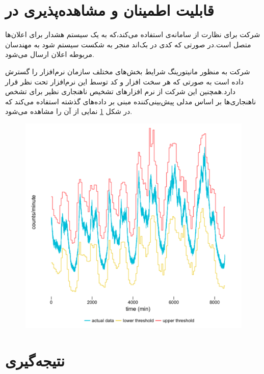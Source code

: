 \section{قابلیت اطمینان و مشاهده‌پذیری در }
شرکت  برای نظارت از سامانه‌ی \cite{Nagios} استفاده می‌کند،که به یک سیستم هشدار برای اعلان‌ها متصل است.در صورتی که کدی در بک‌اند منجر به شکست سیستم شود به مهندسان مربوطه اعلان ارسال می‌شود.


شرکت  به منظور مانیتورینگ شرایط بخش‌های مختلف سازمان نرم‌افزار \cite{m3} را گسترش داده است به صورتی که هر سخت افزار و کد توسط این نرم‌افزار تحت نظر قرار دارد.همچنین این شرکت از نرم افزار‌های تشخیص ناهنجاری نظیر \cite{argos} برای تشخص ناهنجاری‌ها بر اساس مدلی پیش‌بینی‌کننده مبنی بر داده‌های گذشته استفاده می‌کند که در شکل \ref{fig:argos} نمایی از آن را مشاهده می‌شود.

\begin{figure}[h]
\centering
\includegraphics[scale=0.5]{argos.png}
\caption{}
\label{fig:argos}
\end{figure}

\section{نتیجه‌گیری}